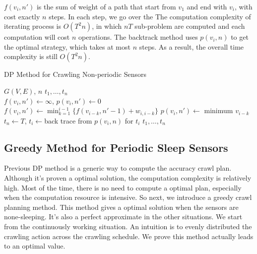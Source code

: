 \documentclass[conference]{IEEEtran}
\begin{document}
$f(v_i,n')$ is the sum of weight of a path that start from $v_1$ and end with $v_i$, with cost exactly $n$ steps. In each step, we go over the  The computation complexity of iterating process is $O(T^2n)$, in which $nT$ sub-problem are computed and each computation will cost $n$ operations. The backtrack method uses $p(v_i, n)$ to get the optimal strategy, which takes at most $n$ steps. As a result, the overall time complexity is still $O(T^2n)$.
\begin{algorithm}
	\caption{DP Method for Crawling Non-periodic Sensors}
	\label{alg:dp_min}
	\begin{algorithmic}[1]
		\renewcommand{\algorithmicrequire}{\textbf{Input:}}
		\renewcommand{\algorithmicensure}{\textbf{Output:}}
		\REQUIRE $G(V,E)$, $n$
		\ENSURE  $t_1,\ldots,t_n$
		\\
		\STATE $f(v_i,n') \gets \infty$, $p(v_i,n')\gets 0$
		\STATE $f(v_i,n')\gets\min_{k=1}^{i-1}\{f(v_{i-k}, n'-1)+w_{i,i-k}\}$
		\STATE $p(v_i,n')\gets$ minimum $v_{i-k}$
		\ENDFOR
		\ENDFOR
		\STATE $t_n\gets T$, $t_i\gets$back trace from $p(v_i, n)$ for $t_i$
		\RETURN $t_1,\ldots,t_n$
	\end{algorithmic}
\end{algorithm}

\subsection{Greedy Method for Periodic Sleep Sensors}

Previous DP method is a generic way to compute the accuracy crawl plan. 
Although it's proven a optimal solution, the computation complexity is relatively high.
Most of the time, there is no need to compute a optimal plan, especially when the computation resource is intensive.
So next, we introduce a greedy crawl planning method.
This method gives a optimal solution when the sensors are none-sleeping. 
It's also a perfect approximate in the other situations.
We start from the continuously working situation. 
An intuition is to evenly distributed the crawling action across the crawling schedule. 
We prove this method actually leads to an optimal value.
\end{document}
